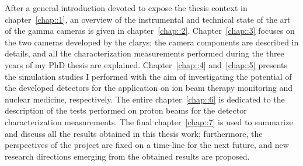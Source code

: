 After a general introduction devoted to expose the thesis context in chapter~\ref{chap::1}, an overview of the instrumental and technical state of the art of the gamma cameras is given in chapter~\ref{chap::2}. Chapter~\ref{chap::3} focuses on the two cameras developed by the \acrshort{clarys}; the camera components are described in details, and all the characterization measurements performed during the three years of my PhD thesis are explained. Chapter~\ref{chap::4} and~\ref{chap::5} presents the simulation studies I performed with the aim of investigating the potential of the developed detectors for the application on ion beam therapy monitoring and nuclear medicine, respectively. The entire chapter~\ref{chap::6} is dedicated to the description of the tests performed on proton beams for the detector characterization measurements. The final chapter~\ref{chap::7} is used to summarize and discuss all the results obtained in this thesis work; furthermore, the perspectives of the project are fixed on a time-line for the next future, and new research directions emerging from the obtained results are proposed.        